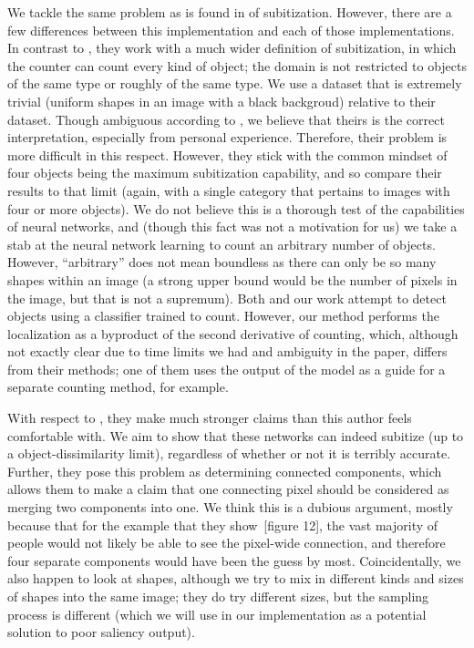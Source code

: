 We tackle the same problem as is found in \cite{Zhang_2015_CVPR, guan2021understanding} of
subitization. However, there are a few differences between this implementation and each of those
implementations. In contrast to \cite{Zhang_2015_CVPR}, they work with a much wider definition of
subitization, in which the counter can count every kind of object; the domain is not restricted to
objects of the same type or roughly of the same type. We use a dataset that is extremely trivial
(uniform shapes in an image with a black backgroud) relative to their dataset. Though ambiguous
according to \cite{subitizingdefinition}, we believe that theirs is the correct interpretation,
especially from personal experience. Therefore, their problem is more difficult in this respect.
However, they stick with the common mindset of four objects being the maximum subitization
capability, and so compare their results to that limit (again, with a single category that pertains
to images with four or more objects). We do not believe this is a thorough test of the capabilities
of neural networks, and (though this fact was not a motivation for us) we take a stab at the neural
network learning to count an arbitrary number of objects. However, ``arbitrary'' does not mean
boundless as there can only be so many shapes within an image (a strong upper bound would be the
number of pixels in the image, but that is not a supremum). Both \cite{Zhang_2015_CVPR} and our work
attempt to detect objects using a classifier trained to count. However, our method performs the
localization as a byproduct of the second derivative of counting, which, although not exactly clear
due to time limits we had and ambiguity in the paper, differs from their methods; one of them uses
the output of the model as a guide for a separate counting method, for example.

With respect to \cite{guan2021understanding}, they make much stronger claims than this author feels
comfortable with. We aim to show that these networks can indeed subitize (up to a
object-dissimilarity limit), regardless of whether or not it is terribly accurate. Further, they
pose this problem as determining connected components, which allows them to make a claim that one
connecting pixel should be considered as merging two components into one. We think this is a dubious
argument, mostly because that for the example that they show~\cite{guan2021understanding}[figure
12], the vast majority of people would not likely be able to see the pixel-wide connection, and
therefore four separate components would have been the guess by most. Coincidentally, we also happen
to look at shapes, although we try to mix in different kinds and sizes of shapes into the same
image; they do try different sizes, but the sampling process is different (which we will use in our
implementation as a potential solution to poor saliency output).






